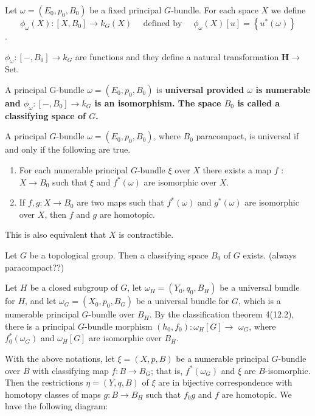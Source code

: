 Let $\omega=\left(E_0, p_0, B_0\right)$ be a fixed principal $G$-bundle. For each space $X$ we define $$\phi_\omega(X):\left[X, B_0\right] \rightarrow k_G(X) \quad \text{ defined by } \quad \phi_\omega(X)[u]=\left\{u^*(\omega)\right\}$$.

\begin{prop}
    
     $\phi_\omega:\left[-, B_0\right] \rightarrow k_G$ are functions and they define a natural transformation $\mathbf{H} \rightarrow$ Set.
\end{prop}


A principal G-bundle $\omega=\left(E_0, p_0, B_0\right)$ is \bf{universal} provided $\omega$ is numerable and $\phi_\omega:\left[-, B_0\right] \rightarrow k_G$ is an isomorphism. The space $B_0$ is called a \bf{classifying space} of $G$.

\begin{theo}
    A principal $G$-bundle $\omega=\left(E_0, p_0, B_0\right)$, where $B_0$ paracompact, is universal if and only if the following are true.
    \begin{enumerate}
        \item For each numerable principal $G$-bundle $\xi$ over $X$ there exists a map $f$ : $X \rightarrow B_0$ such that $\xi$ and $f^*(\omega)$ are isomorphic over $X$.
        \item If $f, g: X \rightarrow B_0$ are two maps such that $f^*(\omega)$ and $g^*(\omega)$ are isomorphic over $X$, then $f$ and $g$ are homotopic.
    \end{enumerate}
This is also equivalent that $X$ is contractible.
\end{theo}


\begin{theo}[Milnor]
    Let $G$ be a topological group. Then a classifying space $B_0$ of $G$ exists. (always paracompact??)
\end{theo}


Let $H$ be a closed subgroup of $G$, let $\omega_H=\left(Y_0, q_0, B_H\right)$ be a universal bundle for $H$, and let $\omega_G=\left(X_0, p_0, B_G\right)$ be a universal bundle for $G$, which is a numerable principal $G$-bundle over $B_H$. By the classification theorem 4(12.2), there is a principal $G$-bundle morphism $\left(h_0, f_0\right): \omega_H[G] \rightarrow$ $\omega_G$, where $f_0^*\left(\omega_G\right)$ and $\omega_H[G]$ are isomorphic over $B_H$.

\begin{theo}
    With the above notations, let $\xi=(X, p, B)$ be a numerable principal $G$-bundle over $B$ with classifying map $f: B \rightarrow B_G$; that is, $f^*\left(\omega_G\right)$ and $\xi$ are $B$-isomorphic. Then the restrictions $\eta=(Y, q, B)$ of $\xi$ are in bijective correspondence with homotopy classes of maps $g: B \rightarrow B_H$ such that $f_0 g$ and $f$ are homotopic. We have the following diagram:
    
\end{theo}


